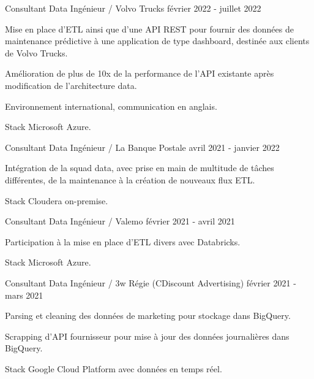 \begin{cventries}
	\cventry
	{Consultant Data Ingénieur / Volvo Trucks}{}{}
	{février 2022 - juillet 2022}
	{
		\begin{cvitems}
			\item Mise en place d'ETL ainsi que d'une API REST pour fournir des données de maintenance prédictive à une application de type dashboard, destinée aux clients de Volvo Trucks.
			\item Amélioration de plus de 10x de la performance de l'API existante après modification de l'architecture data.
			\item Environnement international, communication en anglais.
			\item Stack Microsoft Azure.
		\end{cvitems}
	}
	
	\cventry
	{Consultant Data Ingénieur / La Banque Postale}{}{}
	{avril 2021 - janvier 2022}
	{
		\begin{cvitems}
			\item Intégration de la squad data, avec prise en main de multitude de tâches différentes, de la maintenance à la création de nouveaux flux ETL.
			\item Stack Cloudera on-premise.
		\end{cvitems}
	}
	
	\newpage

	\cventry
	{Consultant Data Ingénieur / Valemo}{}{}
	{février 2021 - avril 2021}
	{
		\begin{cvitems}
			\item Participation à la mise en place d'ETL divers avec Databricks.
			\item Stack Microsoft Azure.
		\end{cvitems}
	}
	
	\cventry
	{Consultant Data Ingénieur / 3w Régie (CDiscount Advertising)}{}{}
	{février 2021 - mars 2021}
	{
		\begin{cvitems}
			\item 
			\item Parsing et cleaning des données de marketing pour stockage dans BigQuery.
			\item Scrapping d'API fournisseur pour mise à jour des données journalières dans BigQuery.
			\item Stack Google Cloud Platform avec données en temps réel.
		\end{cvitems}
	}
	

\end{cventries}
